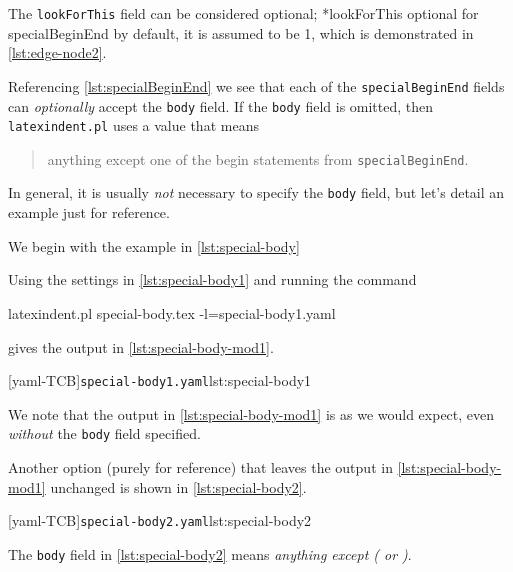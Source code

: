  The \texttt{lookForThis} field can be considered optional;
 *{lookForThis optional for specialBeginEnd} by default, it is
 assumed to be 1, which is demonstrated in \cref{lst:edge-node2}.%

 Referencing \vref{lst:specialBeginEnd} we see that  each of the \texttt{specialBeginEnd} fields can \emph{optionally} accept the
 \texttt{body} field. If the \texttt{body} field is omitted, then \texttt{latexindent.pl}
 uses a value that means
 \begin{quote}
  anything except one of the begin statements from \texttt{specialBeginEnd}.
 \end{quote}

 In general, it is usually \emph{not} necessary to specify the \texttt{body} field, but
 let's detail an example just for reference.

 \begin{example}
 We begin with the example in \cref{lst:special-body}


 Using the settings in \cref{lst:special-body1} and running the command

 \begin{commandshell}
latexindent.pl special-body.tex -l=special-body1.yaml
\end{commandshell}

 gives the output in \cref{lst:special-body-mod1}.

 \begin{cmhtcbraster}[ raster left skip=-3.5cm,]
  [yaml-TCB]{\texttt{special-body1.yaml}}{lst:special-body1}
 \end{cmhtcbraster}
 We note that the output in \cref{lst:special-body-mod1} is as we would expect, even
 \emph{without} the \texttt{body} field specified.

 Another option (purely for reference) that leaves the output in
 \cref{lst:special-body-mod1} unchanged is shown in \cref{lst:special-body2}.

 [yaml-TCB]{\texttt{special-body2.yaml}}{lst:special-body2}

 The \texttt{body} field in \cref{lst:special-body2} means \emph{anything except ( or )}.
 \end{example}

